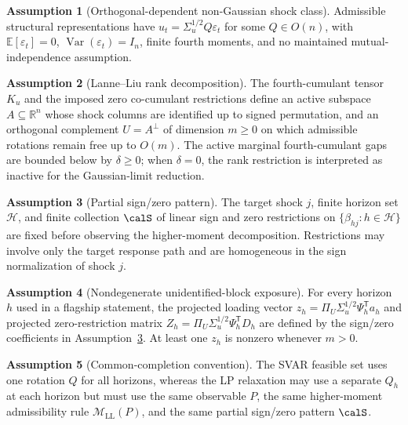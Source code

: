 \documentclass[11pt]{article}
\newcommand{\E}{\mathbb{E}}
\newcommand{\transpose}{\mathsf{T}}
\newcommand{\calH}{\mathcal{H}}
\newcommand{\R}{\mathbb{R}}
\theoremstyle{definition}
\newtheorem{assumption}{Assumption}
\theoremstyle{plain}
\theoremstyle{remark}
\begin{document}
\begin{assumption}[Orthogonal-dependent non-Gaussian shock class]\label{ass:od-ng}
Admissible structural representations have $u_t=\Sigma_u^{1/2}Q\varepsilon_t$ for some $Q\in O(n)$, with $\E[\varepsilon_t]=0$, $\operatorname{Var}(\varepsilon_t)=I_n$, finite fourth moments, and no maintained mutual-independence assumption.
\end{assumption}

\begin{assumption}[Lanne--Liu rank decomposition]\label{ass:ll-rank}
The fourth-cumulant tensor $K_u$ and the imposed zero co-cumulant restrictions define an active subspace $A\subseteq\R^n$ whose shock columns are identified up to signed permutation, and an orthogonal complement $U=A^\perp$ of dimension $m\ge 0$ on which admissible rotations remain free up to $O(m)$.  The active marginal fourth-cumulant gaps are bounded below by $\delta\ge 0$; when $\delta=0$, the rank restriction is interpreted as inactive for the Gaussian-limit reduction.
\end{assumption}

\begin{assumption}[Partial sign/zero pattern]\label{ass:sign-zero}
The target shock $j$, finite horizon set $\calH$, and finite collection $\calS$ of linear sign and zero restrictions on $\{\beta_{hj}:h\in\calH\}$ are fixed before observing the higher-moment decomposition.  Restrictions may involve only the target response path and are homogeneous in the sign normalization of shock $j$.
\end{assumption}

\begin{assumption}[Nondegenerate unidentified-block exposure]\label{ass:exposure}
For every horizon $h$ used in a flagship statement, the projected loading vector $z_h=\Pi_U\Sigma_u^{1/2}\Psi_h^{\transpose}a_h$ and projected zero-restriction matrix $Z_h=\Pi_U\Sigma_u^{1/2}\Psi_h^{\transpose}D_h$ are defined by the sign/zero coefficients in Assumption~\ref{ass:sign-zero}.  At least one $z_h$ is nonzero whenever $m>0$.
\end{assumption}

\begin{assumption}[Common-completion convention]\label{ass:common-completion}
The SVAR feasible set uses one rotation $Q$ for all horizons, whereas the LP relaxation may use a separate $Q_h$ at each horizon but must use the same observable $P$, the same higher-moment admissibility rule $\mathcal{M}_{\mathrm{LL}}(P)$, and the same partial sign/zero pattern $\calS$.
\end{assumption}
\end{document}
